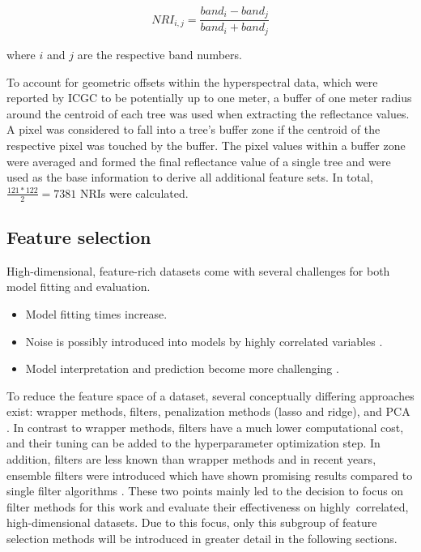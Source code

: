 \documentclass[remotesensing,article,submit,moreauthors,pdftex]{Definitions/mdpi}
\begin{document}
\begin{equation}
	NRI_{i,j} = \frac{band_{i} - band_{j}}{band_{i} + band_{j}}
\end{equation}

\noindent
where \(i\) and \(j\) are the respective band numbers.

\bigbreak{}

To account for geometric offsets within the hyperspectral data, which were reported by \ac{ICGC} to be potentially up to one meter, a buffer of one meter radius around the centroid of each tree was used when extracting the reflectance values.
A pixel was considered to fall into a tree's buffer zone if the centroid of the respective pixel was touched by the buffer.
The pixel values within a buffer zone were averaged and formed the final reflectance value of a single tree and were used as the base information to derive all additional feature sets.
In total, \(\frac{121*122}{2} = 7381\) NRIs were calculated.

\subsection{Feature selection}

High-dimensional, feature-rich datasets come with several challenges for both model fitting and evaluation.

\begin{itemize}
	\item Model fitting times increase.
	\item Noise is possibly introduced into models by highly correlated variables \cite{johnstoneiainm.2009}.
	\item Model interpretation and prediction become more challenging \cite{johnstoneiainm.2009}.
\end{itemize}

To reduce the feature space of a dataset, several conceptually differing approaches exist: wrapper methods, filters, penalization methods (lasso and ridge), and \ac{PCA} \cite{bommert2020, das2001, guyon2003, jolliffe2016}.
In contrast to wrapper methods, filters have a much lower computational cost, and their tuning can be added to the hyperparameter optimization step.
In addition, filters are less known than wrapper methods and in recent years, ensemble filters were introduced which have shown promising results compared to single filter algorithms \cite{drotar2017}.
These two points mainly led to the decision to focus on filter methods for this work and evaluate their effectiveness on highly\ correlated, high-dimensional datasets.
Due to this focus, only this subgroup of feature selection methods will be introduced in greater detail in the following sections.
\end{document}
